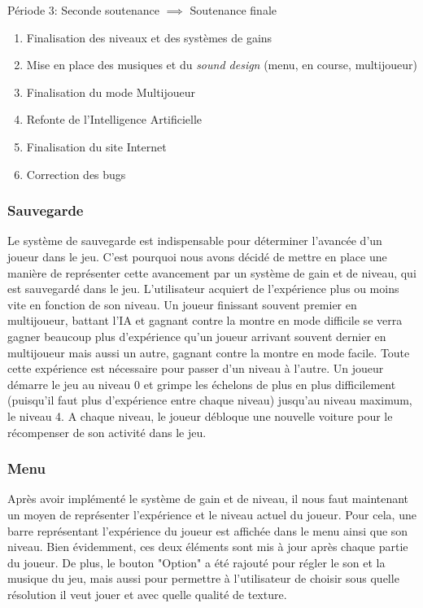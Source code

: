 \documentclass[a4paper,12pt]{article}
\newcommand{\AI}{Intelligence Artificielle}
\begin{document}
         \begin{description}
    \item Période 3: Seconde soutenance \(\implies\) Soutenance finale
        \begin{enumerate}
            \item Finalisation des niveaux et des systèmes de gains
            \item Mise en place des musiques et du \textit{sound design} (menu, en course, multijoueur)
            \item Finalisation du mode Multijoueur
            \item Refonte de l'\AI
            \item Finalisation du site Internet
            \item Correction des bugs
        \end{enumerate}
   \end{description}  
        
        
            \subsubsection{Sauvegarde}
               Le système de sauvegarde est indispensable pour déterminer l'avancée d'un joueur dans le jeu. C'est pourquoi nous avons décidé de mettre en place une manière de représenter cette avancement par un système 
               de gain et de niveau, qui est sauvegardé dans le jeu. L'utilisateur acquiert de l'expérience plus ou moins vite en fonction de son niveau. Un joueur finissant souvent premier en multijoueur, battant l'IA et
               gagnant contre la montre en mode difficile se verra gagner beaucoup plus d'expérience qu'un joueur arrivant souvent dernier en multijoueur mais aussi un autre, gagnant contre la montre en mode facile. 
               Toute cette expérience est nécessaire pour passer d'un niveau à l'autre. Un joueur démarre le jeu au 
               niveau 0 et grimpe les échelons de plus en plus difficilement (puisqu'il faut plus d'expérience entre 
               chaque niveau) jusqu'au niveau maximum, le niveau 4. A chaque niveau, le joueur débloque une nouvelle 
               voiture pour le récompenser de son activité dans le jeu.
               
            \subsubsection{Menu}
                Après avoir implémenté le système de gain et de niveau, il nous faut maintenant un moyen de représenter
                l'expérience et le niveau actuel du joueur. Pour cela, une barre représentant l'expérience du joueur est
                affichée dans le menu ainsi que son niveau. Bien évidemment, ces deux éléments sont mis à jour après 
                chaque partie du joueur. De plus, le bouton "Option" a été rajouté pour régler le son et la musique du 
                jeu, mais aussi pour permettre à l'utilisateur de choisir sous quelle résolution il veut jouer et avec 
                quelle qualité de texture.  
                
\end{document}
